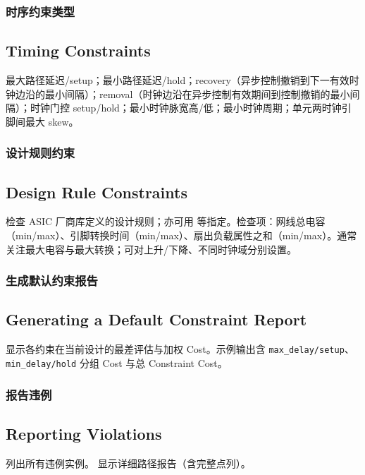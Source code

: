 \subsubsection{时序约束类型}
\subsection*{Timing Constraints}

最大路径延迟/setup；最小路径延迟/hold；recovery（异步控制撤销到下一有效时钟边沿的最小间隔）；removal（时钟边沿在异步控制有效期间到控制撤销的最小间隔）；时钟门控 setup/hold；最小时钟脉宽高/低；最小时钟周期；单元两时钟引脚间最大 skew。

\subsubsection{设计规则约束}
\subsection*{Design Rule Constraints}

检查 ASIC 厂商库定义的设计规则；亦可用  等指定。检查项：网线总电容（min/max）、引脚转换时间（min/max）、扇出负载属性之和（min/max）。通常关注最大电容与最大转换；可对上升/下降、不同时钟域分别设置。

\subsubsection{生成默认约束报告}
\subsection*{Generating a Default Constraint Report}

 显示各约束在当前设计的最差评估与加权 Cost。示例输出含 \texttt{max\_delay/setup}、\texttt{min\_delay/hold} 分组 Cost 与总 Constraint Cost。

\subsubsection{报告违例}
\subsection*{Reporting Violations}

 列出所有违例实例。 显示详细路径报告（含完整点列）。

